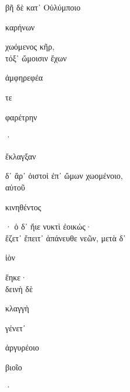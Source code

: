 \documentclass{ransom}
\begin{document}
\begin{foreignpage}
\begin{graytext}
βῆ δὲ κατ᾽ Οὐλύμποιο \begin{whitetext}καρήνων\end{whitetext} χωόμενος κῆρ,\\
τόξ᾽ ὤμοισιν ἔχων \begin{whitetext}ἀμφηρεφέα\end{whitetext} τε \begin{whitetext}φαρέτρην\end{whitetext}·\hfill{}\\
\begin{whitetext}ἔκλαγξαν\end{whitetext} δ᾽ ἄρ᾽ ὀιστοὶ ἐπ᾽ ὤμων χωομένοιο,\\
αὐτοῦ \begin{whitetext}κινηθέντος\end{whitetext}· ὁ δ᾽ ἤιε νυκτὶ ἐοικώς·\\
ἕζετ᾽ ἔπειτ᾽ ἀπάνευθε νεῶν, μετὰ δ᾽ \begin{whitetext}ἰὸν\end{whitetext} ἕηκε·\\
δεινὴ δὲ \begin{whitetext}κλαγγὴ\end{whitetext} γένετ᾽ \begin{whitetext}ἀργυρέοιο\end{whitetext} \begin{whitetext}βιοῖο\end{whitetext}·\\

\end{graytext}


\end{foreignpage}
\end{document}
